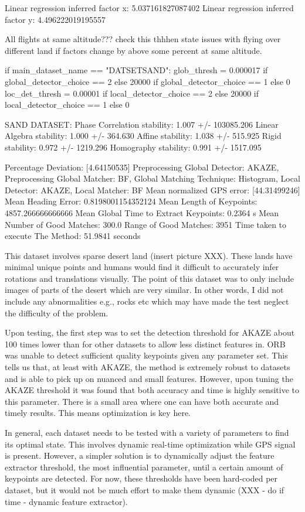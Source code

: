 Linear regression inferred factor x: 5.037161827087402
Linear regression inferred factor y: 4.496222019195557

All flights at same altitude??? check this thhhen state issues with flying over different land if factors change by above some percent at same altitude. 


if main_dataset_name == "DATSETSAND":
    glob_thresh = 0.000017 if global_detector_choice == 2 else 20000 if global_detector_choice == 1 else 0
    loc_det_thresh = 0.00001 if local_detector_choice == 2 else 20000 if local_detector_choice == 1 else 0

SAND DATASET:
Phase Correlation stability: 1.007 +/- 103085.206
Linear Algebra stability: 1.000 +/- 364.630
Affine stability: 1.038 +/- 515.925
Rigid stability: 0.972 +/- 1219.296
Homography stability: 0.991 +/- 1517.095

Percentage Deviation: [4.64150535] %
Preprocessing Global Detector: AKAZE, Preprocessing Global Matcher: BF, Global Matching Technique: Histogram, Local Detector: AKAZE, Local Matcher: BF
Mean normalized GPS error: [44.31499246]
 Mean Heading Error: 0.8198001154352124
Mean Length of Keypoints: 4857.266666666666
Mean Global Time to Extract Keypoints: 0.2364 s
Mean Number of Good Matches: 300.0
Range of Good Matches: 3951
Time taken to execute The Method: 51.9841 seconds

This dataset involves sparse desert land (insert picture XXX). These lands have minimal unique points and humans would find it difficult to accurately infer rotations and translations visually. The point of this dataset was to only include images of parts of the desert which are very similar. In other words, I did not include any abnormalities e.g., rocks etc which may have made the test neglect the difficulty of the problem. 

Upon testing, the first step was to set the detection threshold for AKAZE about 100 times lower than for other datasets to allow less distinct features in. ORB was unable to detect sufficient quality keypoints given any parameter set. This tells us that, at least with AKAZE, the method is extremely robust to datasets and is able to pick up on nuanced and small features. However, upon tuning the AKAZE threshold it was found that both accuracy and time is highly sensitive to this parameter. There is a small area where one can have both accurate and timely results. This means optimization is key here. 

In general, each dataset needs to be tested with a variety of parameters to find its optimal state. This involves dynamic real-time optimization while GPS signal is present. However, a simpler solution is to dynamically adjust the feature extractor threshold, the most influential parameter, until a certain amount of keypoints are detected. For now, these thresholds have been hard-coded per dataset, but it would not be much effort to make them dynamic (XXX - do if time - dynamic feature extractor). 


